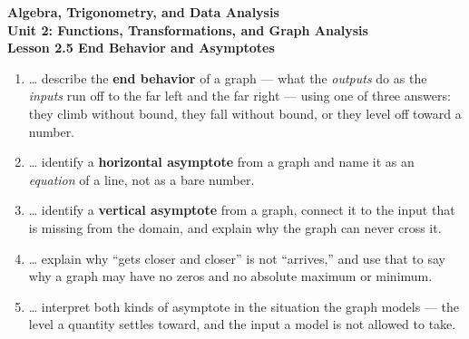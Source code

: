 \documentclass[10pt]{article}
\begin{document}
\vspace{-0.8in}

\begin{center}
  {\color{white}\textbf{\LARGE Algebra, Trigonometry, and Data Analysis}}\\[4pt]
  {\color{mistmid}\large\textbf{Unit 2: Functions, Transformations, and Graph Analysis}}\\[6pt]
  {\color{white}\textbf{\large Lesson 2.5 \quad End Behavior and Asymptotes}}
\end{center}

\vspace{0.22in}
\namedateperiod
\vspace{0.18in}

\begin{learningtargetbox}
\small
\begin{enumerate}[leftmargin=1.5em, itemsep=5pt]
  \item \ldots{} describe the \textbf{end behavior} of a graph --- what the \emph{outputs} do as the
        \emph{inputs} run off to the far left and the far right --- using one of three answers: they
        climb without bound, they fall without bound, or they level off toward a number.
  \item \ldots{} identify a \textbf{horizontal asymptote} from a graph and name it as an
        \emph{equation} of a line, not as a bare number.
  \item \ldots{} identify a \textbf{vertical asymptote} from a graph, connect it to the input that is
        missing from the domain, and explain why the graph can never cross it.
  \item \ldots{} explain why ``gets closer and closer'' is not ``arrives,'' and use that to say why a
        graph may have no zeros and no absolute maximum or minimum.
  \item \ldots{} interpret both kinds of asymptote in the situation the graph models --- the level a
        quantity settles toward, and the input a model is not allowed to take.
\end{enumerate}
\end{learningtargetbox}

\vspace{0.14in}
\end{document}
